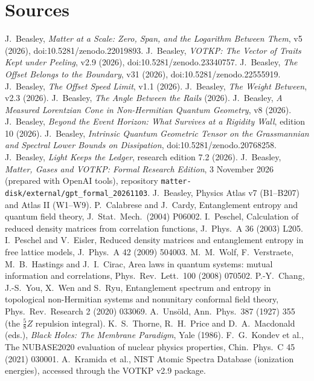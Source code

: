 \section*{Sources}
\small\sloppy
J.~Beasley, \emph{Matter at a Scale: Zero, Span, and the Logarithm Between Them}, v5 (2026), doi:10.5281/zenodo.22019893.
J.~Beasley, \emph{VOTKP: The Vector of Traits Kept under Peeling}, v2.9 (2026), doi:10.5281/zenodo.23340757.
J.~Beasley, \emph{The Offset Belongs to the Boundary}, v31 (2026), doi:10.5281/zenodo.22555919.
J.~Beasley, \emph{The Offset Speed Limit}, v1.1 (2026).
J.~Beasley, \emph{The Weight Between}, v2.3 (2026).
J.~Beasley, \emph{The Angle Between the Rails} (2026).
J.~Beasley, \emph{A Measured Lorentzian Cone in Non-Hermitian Quantum Geometry}, v8 (2026).
J.~Beasley, \emph{Beyond the Event Horizon: What Survives at a Rigidity Wall}, edition 10 (2026).
J.~Beasley, \emph{Intrinsic Quantum Geometric Tensor on the Grassmannian and Spectral Lower Bounds on Dissipation}, doi:10.5281/zenodo.20768258.
J.~Beasley, \emph{Light Keeps the Ledger}, research edition 7.2 (2026).
J.~Beasley, \emph{Matter, Gases and VOTKP: Formal Research Edition}, 3 November 2026 (prepared with OpenAI tools), repository \texttt{matter-disk/external/gpt\_formal\_20261103}.
J.~Beasley, Physics Atlas v7 (B1–B207) and Atlas II (W1–W9).
P.~Calabrese and J.~Cardy, Entanglement entropy and quantum field theory, J.\ Stat.\ Mech.\ (2004) P06002.
I.~Peschel, Calculation of reduced density matrices from correlation functions, J.\ Phys.\ A 36 (2003) L205.
I.~Peschel and V.~Eisler, Reduced density matrices and entanglement entropy in free lattice models, J.\ Phys.\ A 42 (2009) 504003.
M.~M.~Wolf, F.~Verstraete, M.~B.~Hastings and J.~I.~Cirac, Area laws in quantum systems: mutual information and correlations, Phys.\ Rev.\ Lett.\ 100 (2008) 070502.
P.-Y.~Chang, J.-S.~You, X.~Wen and S.~Ryu, Entanglement spectrum and entropy in topological non-Hermitian systems and nonunitary conformal field theory, Phys.\ Rev.\ Research 2 (2020) 033069.
A.~Unsöld, Ann.\ Phys.\ 387 (1927) 355 (the $\tfrac58Z$ repulsion integral).
K.~S.~Thorne, R.~H.~Price and D.~A.~Macdonald (eds.), \emph{Black Holes: The Membrane Paradigm}, Yale (1986).
F.~G.~Kondev et al., The NUBASE2020 evaluation of nuclear physics properties, Chin.\ Phys.\ C 45 (2021) 030001.
A.~Kramida et al., NIST Atomic Spectra Database (ionization energies), accessed through the VOTKP v2.9 package.
\normalsize
